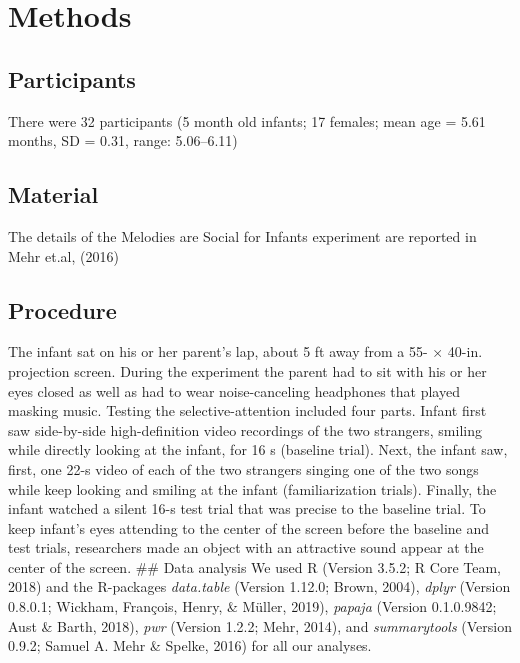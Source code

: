 \documentclass[man]{apa6}
\begin{document}
\section{Methods}\label{methods}

\subsection{Participants}\label{participants}

There were 32 participants (5 month old infants; 17 females; mean age =
5.61 months, SD = 0.31, range: 5.06--6.11)

\subsection{Material}\label{material}

The details of the Melodies are Social for Infants experiment are
reported in Mehr et.al, (2016)

\subsection{Procedure}\label{procedure}

The infant sat on his or her parent's lap, about 5 ft away from a 55- ×
40-in. projection screen. During the experiment the parent had to sit
with his or her eyes closed as well as had to wear noise-canceling
headphones that played masking music. Testing the selective-attention
included four parts. Infant first saw side-by-side high-definition video
recordings of the two strangers, smiling while directly looking at the
infant, for 16 s (baseline trial). Next, the infant saw, first, one 22-s
video of each of the two strangers singing one of the two songs while
keep looking and smiling at the infant (familiarization trials).
Finally, the infant watched a silent 16-s test trial that was precise to
the baseline trial. To keep infant's eyes attending to the center of the
screen before the baseline and test trials, researchers made an object
with an attractive sound appear at the center of the screen. \#\# Data
analysis We used R (Version 3.5.2; R Core Team, 2018) and the R-packages
\emph{data.table} (Version 1.12.0; Brown, 2004), \emph{dplyr} (Version
0.8.0.1; Wickham, François, Henry, \& Müller, 2019), \emph{papaja}
(Version 0.1.0.9842; Aust \& Barth, 2018), \emph{pwr} (Version 1.2.2;
Mehr, 2014), and \emph{summarytools} (Version 0.9.2; Samuel A. Mehr \&
Spelke, 2016) for all our analyses.
\end{document}
